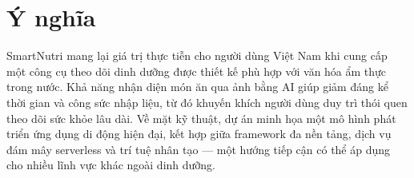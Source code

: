 \section*{Ý nghĩa}

SmartNutri mang lại giá trị thực tiễn cho người dùng Việt Nam khi cung cấp một công cụ theo dõi dinh dưỡng được thiết kế phù hợp với văn hóa ẩm thực trong nước. Khả năng nhận diện món ăn qua ảnh bằng AI giúp giảm đáng kể thời gian và công sức nhập liệu, từ đó khuyến khích người dùng duy trì thói quen theo dõi sức khỏe lâu dài. Về mặt kỹ thuật, dự án minh họa một mô hình phát triển ứng dụng di động hiện đại, kết hợp giữa framework đa nền tảng, dịch vụ đám mây serverless và trí tuệ nhân tạo — một hướng tiếp cận có thể áp dụng cho nhiều lĩnh vực khác ngoài dinh dưỡng.

\newpage
